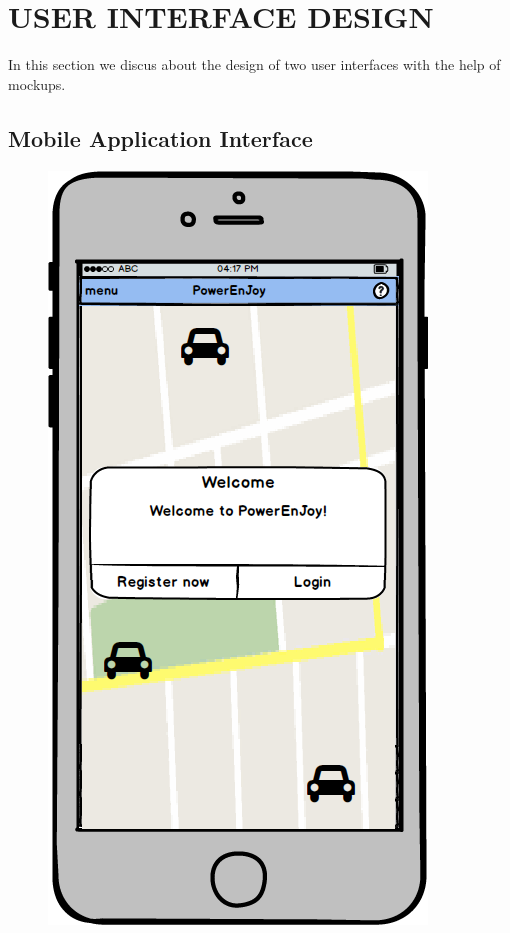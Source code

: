 \documentclass[a4paper,11pt]{article}
\begin{document}
\section{USER INTERFACE DESIGN}
In this section we discus about the design of two user interfaces with the help of mockups.
	\subsection{Mobile Application Interface}
	
	\begin{itemize}
\begin{figure}[H]
  \centering
  \begin{minipage}[t]{.35\linewidth}
    \includegraphics[width=\textwidth]{images/welcome}  

\end{minipage}
\end{figure}
\end{itemize}
\end{document}
